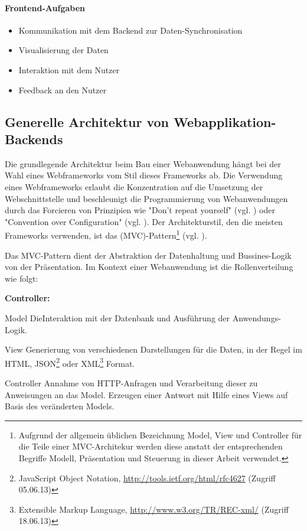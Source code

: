 \paragraph{Frontend-Aufgaben}
\begin{itemize}
  \item Kommunikation mit dem Backend zur Daten-Synchronisation 
  \item Visualisierung der Daten
  \item Interaktion mit dem Nutzer
  \item Feedback an den Nutzer
\end{itemize}
\subsection{Generelle Architektur von Webapplikation-Backends}

Die grundlegende Architektur beim Bau einer Webanwendung hängt bei der Wahl eines Webframeworks vom Stil dieses Frameworks ab. Die Verwendung eines Webframeworks erlaubt die Konzentration auf die Umsetzung der Webschnittstelle und beschleunigt die Programmierung von Webanwendungen durch das Forcieren von Prinzipien wie "Don't repeat yourself" (vgl. \cite[p.~23]{pragmatic-programmer}) oder "Convention over Configuration" (vgl. \cite[p.~3]{maven}). Der Architekturstil, den die meisten Frameworks verwenden, ist das  (MVC)-Pattern\footnote{Aufgrund der allgemein üblichen Bezeichnung Model, View und Controller für die Teile einer MVC-Architekur werden diese anstatt der entsprechenden Begriffe Modell, Präsentation und Steuerung in dieser Arbeit verwendet.} (vgl. \cite[p.~14]{gang-of-four}). 

Das MVC-Pattern dient der Abstraktion der Datenhaltung und Bussines-Logik von der Präsentation. Im Kontext einer Webanwendung ist die Rollenverteilung wie folgt:
\begin{labeling}{\textbf{Controller:}}
\item[Model] DieInteraktion mit der Datenbank und Ausführung der Anwendungs-Logik.
\item[View] Generierung von verschiedenen Darstellungen für die Daten, in der Regel im HTML, JSON\footnote{JavaScript Object Notation, \url{http://tools.ietf.org/html/rfc4627} (Zugriff 05.06.13)} oder XML\footnote{Extensible Markup Language, \url{http://www.w3.org/TR/REC-xml/} (Zugriff 18.06.13)} Format.
\item[Controller] Annahme von HTTP-Anfragen und  Verarbeitung dieser zu Anweisungen an das Model. Erzeugen einer Antwort mit Hilfe eines Views auf Basis des veränderten Models.
\end{labeling}

